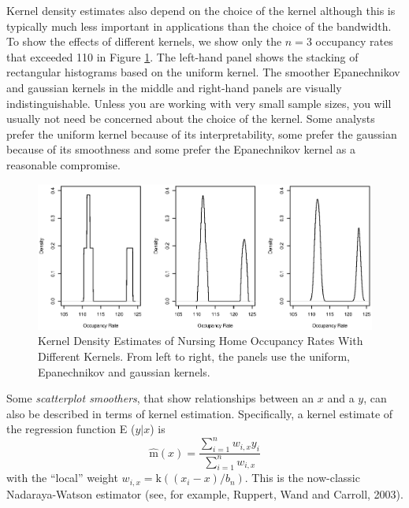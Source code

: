 Kernel density estimates also depend on the choice of the kernel
although this is typically much less important in applications than
the choice of the bandwidth. To show the effects of different
kernels, we show only the $n=3$ occupancy rates that exceeded 110 in
Figure \ref{F15:KernelDensity2}. The left-hand panel shows the
stacking of rectangular histograms based on the uniform kernel. The
smoother Epanechnikov and gaussian kernels in the middle and
right-hand panels are visually indistinguishable. Unless you are
working with very small sample sizes, you will usually not need be
concerned about the choice of the kernel. Some analysts prefer the
uniform kernel because of its interpretability, some prefer the
gaussian because of its smoothness and some prefer the Epanechnikov
kernel as a reasonable compromise.



\begin{figure}[htp]
  \begin{center}
    \includegraphics[width=1\textwidth]
        {Chapter15MiscTopics/F15KernelDensity2.eps}
      \end{center}
        \caption {\label{F15:KernelDensity2}
           {\small Kernel Density Estimates of Nursing Home Occupancy Rates With Different Kernels.
           From left to right, the panels use the uniform, Epanechnikov and gaussian kernels.}}
\end{figure}

Some \emph{scatterplot smoothers}, that show relationships between
an $x$ and a $y$, can also be described in terms of kernel
estimation. Specifically, a kernel estimate of the regression
function E ($y |x$) is
\begin{equation*}
\hat{\mathrm{m}}(x) = \frac{\sum_{i=1}^n w_{i,x} y_i}{\sum_{i=1}^n
w_{i,x}}
\end{equation*}
with the ``local'' weight $w_{i,x} = \mathrm{k}\left( (x_i - x)/b_n
\right)$. This is the now-classic Nadaraya-Watson estimator (see,
for example, Ruppert, Wand and Carroll, 2003).

